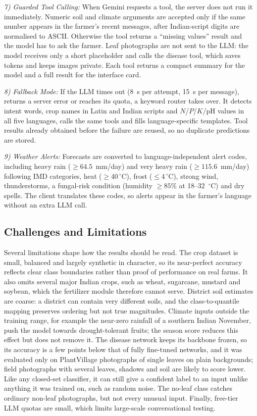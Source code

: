 \documentclass[conference]{IEEEtran}
\begin{document}
\textit{7) Guarded Tool Calling:} When Gemini requests a tool, the server does not run it immediately. Numeric soil and climate arguments are accepted only if the same number appears in the farmer's recent messages, after Indian-script digits are normalised to ASCII. Otherwise the tool returns a ``missing values'' result and the model has to ask the farmer. Leaf photographs are not sent to the LLM: the model receives only a short placeholder and calls the disease tool, which saves tokens and keeps images private. Each tool returns a compact summary for the model and a full result for the interface card.

\textit{8) Fallback Mode:} If the LLM times out (8~s per attempt, 15~s per message), returns a server error or reaches its quota, a keyword router takes over. It detects intent words, crop names in Latin and Indian scripts and $N$/$P$/$K$/pH values in all five languages, calls the same tools and fills language-specific templates. Tool results already obtained before the failure are reused, so no duplicate predictions are stored.

\textit{9) Weather Alerts:} Forecasts are converted to language-independent alert codes, including heavy rain ($\geq 64.5$~mm/day) and very heavy rain ($\geq 115.6$~mm/day) following IMD categories, heat ($\geq 40\,^{\circ}$C), frost ($\leq 4\,^{\circ}$C), strong wind, thunderstorms, a fungal-risk condition (humidity $\geq 85\%$ at 18--32~$^{\circ}$C) and dry spells. The client translates these codes, so alerts appear in the farmer's language without an extra LLM call.

\subsection{Challenges and Limitations}
Several limitations shape how the results should be read. The crop dataset is small, balanced and largely synthetic in character, so its near-perfect accuracy reflects clear class boundaries rather than proof of performance on real farms. It also omits several major Indian crops, such as wheat, sugarcane, mustard and soybean, which the fertilizer module therefore cannot serve. District soil estimates are coarse: a district can contain very different soils, and the class-to-quantile mapping preserves ordering but not true magnitudes. Climate inputs outside the training range, for example the near-zero rainfall of a southern Indian November, push the model towards drought-tolerant fruits; the season score reduces this effect but does not remove it. The disease network keeps its backbone frozen, so its accuracy is a few points below that of fully fine-tuned networks, and it was evaluated only on PlantVillage photographs of single leaves on plain backgrounds; field photographs with several leaves, shadows and soil are likely to score lower. Like any closed-set classifier, it can still give a confident label to an input unlike anything it was trained on, such as random noise. The no-leaf class catches ordinary non-leaf photographs, but not every unusual input. Finally, free-tier LLM quotas are small, which limits large-scale conversational testing.
\end{document}
